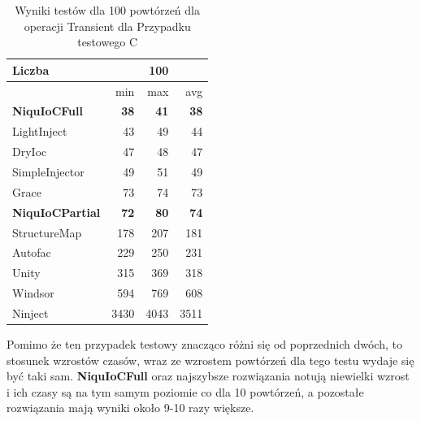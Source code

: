 \documentclass[12pt]{article}
\begin{document}
\begin{table}[H]
\captionsetup{belowskip=0pt,aboveskip=0pt}
\begin{center}
\begin{small}
	\begin{tabular}{ | l | r r r | }
    		\hline
Liczba & & 100 & \\ \hline
 & min & max & avg \\ \hline
\textbf{NiquIoCFull} & \textbf{38} & \textbf{41} & \textbf{38} \\ \hline
LightInject & 43 & 49 & 44 \\ \hline
DryIoc & 47 & 48 & 47 \\ \hline
SimpleInjector & 49 & 51 & 49 \\ \hline
Grace & 73 & 74 & 73 \\ \hline
\textbf{NiquIoCPartial} & \textbf{72} & \textbf{80} & \textbf{74} \\ \hline
StructureMap & 178 & 207 & 181 \\ \hline
Autofac & 229 & 250 & 231 \\ \hline
Unity & 315 & 369 & 318 \\ \hline
Windsor & 594 & 769 & 608 \\ \hline
Ninject & 3430 & 4043 & 3511 \\ \hline
  	\end{tabular}
\end{small}
\end{center}
\caption{Wyniki testów dla 100 powtórzeń dla operacji Transient dla Przypadku testowego C}
\label{TestCaseC_Transient100}
\end{table}
Pomimo że ten przypadek testowy znacząco różni się od poprzednich dwóch, to stosunek wzrostów czasów, wraz ze wzrostem powtórzeń dla tego testu wydaje się być taki sam. \textbf{NiquIoCFull} oraz najszybsze rozwiązania notują niewielki wzrost i ich czasy są na tym samym poziomie co dla 10 powtórzeń, a pozostałe rozwiązania mają wyniki około 9-10 razy większe.
\\ \\
\end{document}
